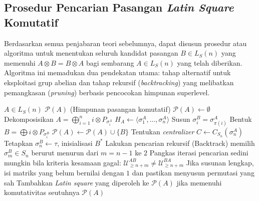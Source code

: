 \documentclass[journal]{IEEEtran}
\theoremstyle{definition}
\theoremstyle{plain}
\begin{document}
\subsection{Prosedur Pencarian Pasangan \textit{Latin Square} Komutatif}
Berdasarkan semua penjabaran teori sebelumnya, dapat disusun prosedur atau algoritma untuk menentukan seluruh kandidat pasangan $B\in L_S(n)$ yang memenuhi $A\otimes B=B\otimes A$ bagi sembarang $A\in L_S(n)$ yang telah diberikan. Algoritma ini memadukan dua pendekatan utama: tahap alternatif untuk eksploitasi grup abelian dan tahap rekursif (\textit{backtracking}) yang melibatkan pemangkasan (\textit{pruning}) berbasis pencocokan himpunan superlevel.

\begin{algorithm}[H]
    \caption{Pencarian Pasangan \textit{Latin Square} Komutatif}
    \begin{algorithmic}[1]
        \Require $A \in L_S(n)$
        \Ensure $\mathcal{P}(A)$ (Himpunan pasangan komutatif)
        \State $\mathcal{P}(A) \gets \emptyset$
        \State Dekomposisikan $A = \bigoplus_{i=1}^n i \otimes P_{\sigma_i^A}$
        \State $H_A \gets \langle \sigma_1^A, \dots, \sigma_n^A \rangle$
        \State Susun $\sigma_i^B = \sigma_{\pi(i)}^A$
        \State Bentuk $B = \bigoplus i \otimes P_{\sigma_i^B}$
        \State $\mathcal{P}(A) \gets \mathcal{P}(A) \cup \{B\}$
        \EndFor
        \EndIf
        \State Tentukan \textit{centralizer} $C \gets C_{S_n}(\sigma_n^A)$
        \State Tetapkan $\sigma_n^B \gets \tau$, inisialisasi $B^*$
        \State Lakukan pencarian rekursif (Backtrack) memilih $\sigma_m^B \in S_n$ berurut menurun dari $m=n-1$ ke $2$
        \State Pangkas iterasi pencarian sedini mungkin bila kriteria kesamaan gagal: $\mathcal{U}_{\ge n+m}^{AB} \neq \mathcal{U}_{\ge n+m}^{BA}$
        \State Jika susunan lengkap, isi matriks yang belum bernilai dengan $1$ dan pastikan menyusun permutasi yang sah
        \State Tambahkan \textit{Latin square} yang diperoleh ke $\mathcal{P}(A)$ jika memenuhi komutativitas seutuhnya
        \EndFor
        \State \Return $\mathcal{P}(A)$
    \end{algorithmic}
\end{algorithm}
\end{document}
